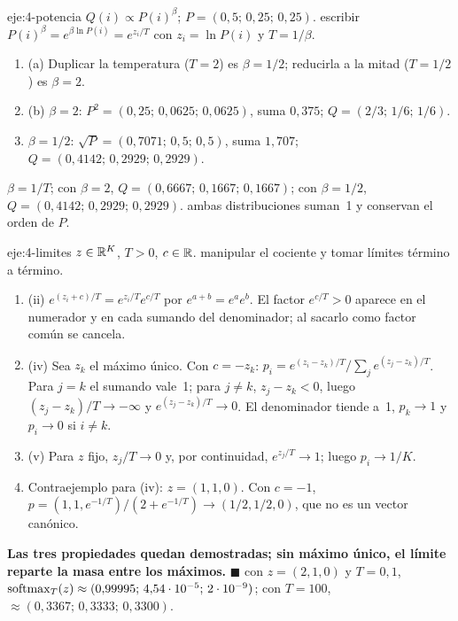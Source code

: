 \begin{solucion}{eje:4-potencia}
\datos $Q(i)\propto P(i)^{\beta}$; $P=(0{,}5;\,0{,}25;\,0{,}25)$.
\planteamiento escribir $P(i)^{\beta}=e^{\beta\ln P(i)}=e^{z_i/T}$ con $z_i=\ln P(i)$ y $T=1/\beta$.
\pasos
\begin{enumerate}[label=\arabic*.]
  \item (a) Duplicar la temperatura ($T=2$) es $\beta=1/2$; reducirla a la mitad ($T=1/2$) es $\beta=2$.
  \item (b) $\beta=2$: $P^{2}=(0{,}25;\,0{,}0625;\,0{,}0625)$, suma $0{,}375$; $Q=(2/3;\,1/6;\,1/6)$.
  \item $\beta=1/2$: $\sqrt{P}=(0{,}7071;\,0{,}5;\,0{,}5)$, suma $1{,}707$; $Q=(0{,}4142;\,0{,}2929;\,0{,}2929)$.
\end{enumerate}
\resultado \textbf{$\beta=1/T$}; con $\beta=2$, $Q=(0{,}6667;\,0{,}1667;\,0{,}1667)$; con $\beta=1/2$, $Q=(0{,}4142;\,0{,}2929;\,0{,}2929)$.
\comprobacion ambas distribuciones suman~1 y conservan el orden de $P$.
\end{solucion}

\begin{solucion}{eje:4-limites}
\datos $z\in\mathbb{R}^{K}$, $T>0$, $c\in\mathbb{R}$.
\planteamiento manipular el cociente y tomar límites término a término.
\pasos
\begin{enumerate}[label=\arabic*.]
  \item (ii) $e^{(z_i+c)/T}=e^{z_i/T}e^{c/T}$ por $e^{a+b}=e^{a}e^{b}$. El factor $e^{c/T}>0$ aparece en el numerador y en cada sumando del denominador; al sacarlo como factor común se cancela.
  \item (iv) Sea $z_k$ el máximo único. Con $c=-z_k$: $p_i=e^{(z_i-z_k)/T}/\sum_j e^{(z_j-z_k)/T}$. Para $j=k$ el sumando vale~1; para $j\ne k$, $z_j-z_k<0$, luego $(z_j-z_k)/T\to-\infty$ y $e^{(z_j-z_k)/T}\to 0$. El denominador tiende a~1, $p_k\to 1$ y $p_i\to 0$ si $i\ne k$.
  \item (v) Para $z$ fijo, $z_j/T\to 0$ y, por continuidad, $e^{z_j/T}\to 1$; luego $p_i\to 1/K$.
  \item Contraejemplo para (iv): $z=(1,1,0)$. Con $c=-1$, $p=(1,1,e^{-1/T})/(2+e^{-1/T})\to(1/2,1/2,0)$, que no es un vector canónico.
\end{enumerate}
\resultado \textbf{Las tres propiedades quedan demostradas; sin máximo único, el límite reparte la masa entre los máximos.} $\blacksquare$
\comprobacion con $z=(2,1,0)$ y $T=0{,}1$, $\operatorname{softmax}_T(z)\approx(0{,}99995;\,4{,}54\cdot 10^{-5};\,2\cdot 10^{-9})$; con $T=100$, $\approx(0{,}3367;\,0{,}3333;\,0{,}3300)$.
\end{solucion}

